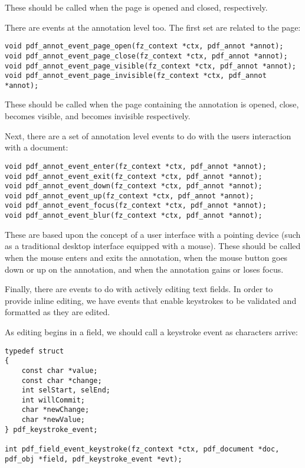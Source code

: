 \documentclass[oneside]{book}
\begin{document}
These should be called when the page is opened and closed, respectively.

There are events at the annotation level too. The first set are related to the page:

\begin{lstlisting}
void pdf_annot_event_page_open(fz_context *ctx, pdf_annot *annot);
void pdf_annot_event_page_close(fz_context *ctx, pdf_annot *annot);
void pdf_annot_event_page_visible(fz_context *ctx, pdf_annot *annot);
void pdf_annot_event_page_invisible(fz_context *ctx, pdf_annot *annot);
\end{lstlisting}

These should be called when the page containing the annotation is opened, close, becomes visible, and becomes invisible respectively.

Next, there are a set of annotation level events to do with the users interaction with a document:

\begin{lstlisting}
void pdf_annot_event_enter(fz_context *ctx, pdf_annot *annot);
void pdf_annot_event_exit(fz_context *ctx, pdf_annot *annot);
void pdf_annot_event_down(fz_context *ctx, pdf_annot *annot);
void pdf_annot_event_up(fz_context *ctx, pdf_annot *annot);
void pdf_annot_event_focus(fz_context *ctx, pdf_annot *annot);
void pdf_annot_event_blur(fz_context *ctx, pdf_annot *annot);
\end{lstlisting}

These are based upon the concept of a user interface with a pointing device (such as a traditional desktop interface equipped with a mouse). These should be called when the mouse enters and exits the annotation, when the mouse button goes down or up on the annotation, and when the annotation gains or loses focus.

Finally, there are events to do with actively editing text fields. In order to provide inline editing, we have events that enable keystrokes to be validated and formatted as they are edited.

As editing begins in a field, we should call a keystroke event as characters arrive:

\begin{lstlisting}
typedef struct
{
	const char *value;
	const char *change;
	int selStart, selEnd;
	int willCommit;
	char *newChange;
	char *newValue;
} pdf_keystroke_event;

int pdf_field_event_keystroke(fz_context *ctx, pdf_document *doc, pdf_obj *field, pdf_keystroke_event *evt);
\end{lstlisting}
\end{document}
